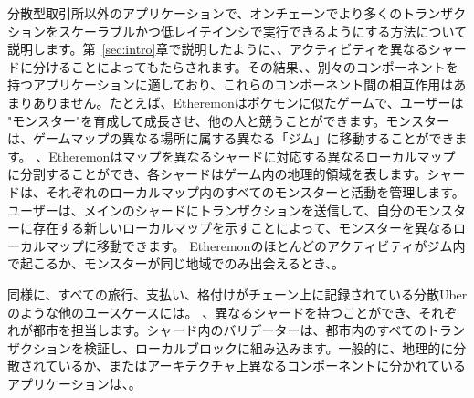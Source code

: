 分散型取引所以外のアプリケーションで、オンチェーンでより多くのトランザクションをスケーラブルかつ低レイテインシで実行できるようにする方法について説明します。第~\ref{sec:intro}章で説明したように、、アクティビティを異なるシャードに分けることによってもたらされます。その結果、、別々のコンポーネントを持つアプリケーションに適しており、これらのコンポーネント間の相互作用はあまりありません。たとえば、Etheremonはポケモンに似たゲームで、ユーザーは "モンスター"を育成して成長させ、他の人と競うことができます。モンスターは、ゲームマップの異なる場所に属する異なる「ジム」に移動することができます。 、Etheremonはマップを異なるシャードに対応する異なるローカルマップに分割することができ、各シャードはゲーム内の地理的領域を表します。シャードは、それぞれのローカルマップ内のすべてのモンスターと活動を管理します。ユーザーは、メインのシャードにトランザクションを送信して、自分のモンスターに存在する新しいローカルマップを示すことによって、モンスターを異なるローカルマップに移動できます。 Etheremonのほとんどのアクティビティがジム内で起こるか、モンスターが同じ地域でのみ出会えるとき、。

同様に、すべての旅行、支払い、格付けがチェーン上に記録されている分散Uberのような他のユースケースには。
、異なるシャードを持つことができ、それぞれが都市を担当します。シャード内のバリデーターは、都市内のすべてのトランザクションを検証し、ローカルブロックに組み込みます。一般的に、地理的に分散されているか、またはアーキテクチャ上異なるコンポーネントに分かれているアプリケーションは、。
